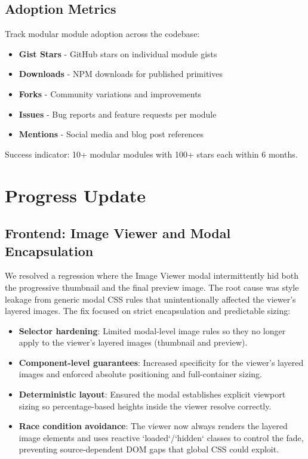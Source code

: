 \documentclass[11pt]{article}
\begin{document}
\subsection{Adoption Metrics}

Track modular module adoption across the codebase:

\begin{itemize}
\item \textbf{Gist Stars} - GitHub stars on individual module gists
\item \textbf{Downloads} - NPM downloads for published primitives
\item \textbf{Forks} - Community variations and improvements
\item \textbf{Issues} - Bug reports and feature requests per module
\item \textbf{Mentions} - Social media and blog post references
\end{itemize}

Success indicator: 10+ modular modules with 100+ stars each within 6 months.

\section{Progress Update}

\subsection{Frontend: Image Viewer and Modal Encapsulation}

We resolved a regression where the Image Viewer modal intermittently hid both the progressive thumbnail and the final preview image. The root cause was style leakage from generic modal CSS rules that unintentionally affected the viewer's layered images. The fix focused on strict encapsulation and predictable sizing:

\begin{itemize}
  \item \textbf{Selector hardening}: Limited modal-level image rules so they no longer apply to the viewer's layered images (thumbnail and preview).
  \item \textbf{Component-level guarantees}: Increased specificity for the viewer's layered images and enforced absolute positioning and full-container sizing.
  \item \textbf{Deterministic layout}: Ensured the modal establishes explicit viewport sizing so percentage-based heights inside the viewer resolve correctly.
  \item \textbf{Race condition avoidance}: The viewer now always renders the layered image elements and uses reactive `loaded`/`hidden` classes to control the fade, preventing source-dependent DOM gaps that global CSS could exploit.
\end{itemize}
\end{document}
